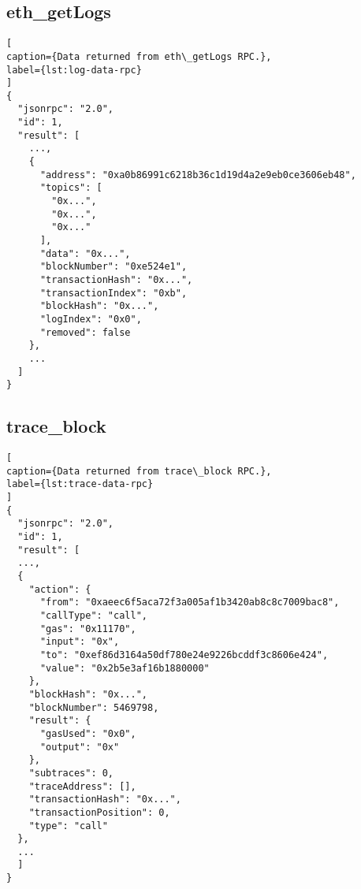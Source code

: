 \subsection*{eth\_getLogs}

\begin{lstlisting}[
caption={Data returned from eth\_getLogs RPC.},
label={lst:log-data-rpc}
]
{
  "jsonrpc": "2.0",
  "id": 1,
  "result": [
    ...,
    {
      "address": "0xa0b86991c6218b36c1d19d4a2e9eb0ce3606eb48",
      "topics": [
        "0x...",
        "0x...",
        "0x..."
      ],
      "data": "0x...",
      "blockNumber": "0xe524e1",
      "transactionHash": "0x...",
      "transactionIndex": "0xb",
      "blockHash": "0x...",
      "logIndex": "0x0",
      "removed": false
    },
    ...
  ]
}
\end{lstlisting}

\subsection*{trace\_block}

\begin{lstlisting}[
caption={Data returned from trace\_block RPC.},
label={lst:trace-data-rpc}
]
{
  "jsonrpc": "2.0",
  "id": 1,
  "result": [
  ...,
  {
    "action": {
      "from": "0xaeec6f5aca72f3a005af1b3420ab8c8c7009bac8",
      "callType": "call",
      "gas": "0x11170",
      "input": "0x",
      "to": "0xef86d3164a50df780e24e9226bcddf3c8606e424",
      "value": "0x2b5e3af16b1880000"
    },
    "blockHash": "0x...",
    "blockNumber": 5469798,
    "result": {
      "gasUsed": "0x0",
      "output": "0x"
    },
    "subtraces": 0,
    "traceAddress": [],
    "transactionHash": "0x...",
    "transactionPosition": 0,
    "type": "call"
  },
  ...
  ]
}
\end{lstlisting}

